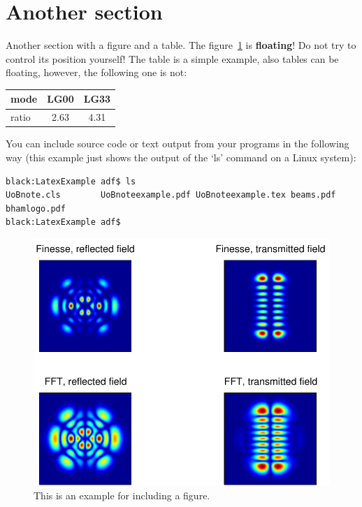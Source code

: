 \documentclass[pdf,color]{UoBnote}
\begin{document}
\section{Another section}

Another  section with a figure and a table.
The figure~\ref{fig:figure1} is \textbf{floating}! Do not try to
control its position yourself!
The table is a simple example, also tables can be floating, however,
the following one is not:
\begin{center}
\begin{tabular}{|l|c|c|}
        \hline
        mode  & LG00 & LG33\\
        \hline
        ratio & 2.63 & 4.31\\
        \hline
\end{tabular}
\end{center}

You can include source code or text output from your programs in the
following way (this example just shows the output of the `ls' command
on a Linux system):
\begin{verbatim}
black:LatexExample adf$ ls
UoBnote.cls        UoBnoteexample.pdf UoBnoteexample.tex beams.pdf          bhamlogo.pdf
black:LatexExample adf$ 
\end{verbatim}


\begin{figure}
\begin{center}
\includegraphics[scale=0.75]{beams.pdf}
\end{center}
\caption{This is an example for including a figure.}\label{fig:figure1}
\end{figure}
\end{document}
